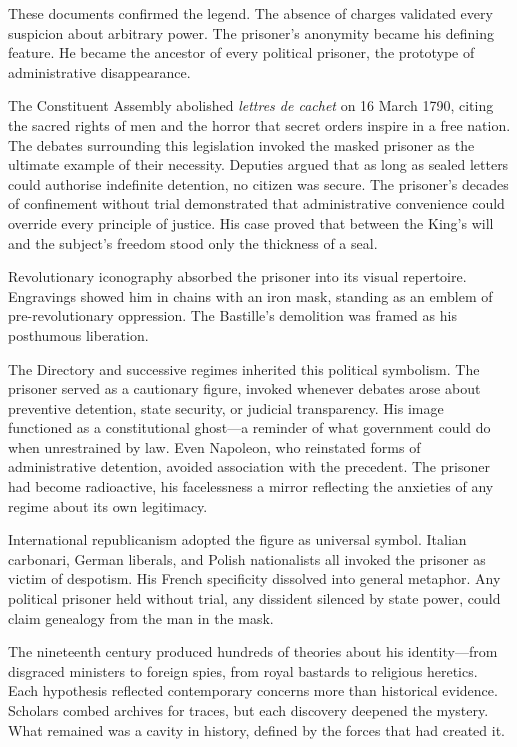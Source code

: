 These documents confirmed the legend. The absence of charges validated every suspicion about arbitrary power. The prisoner's anonymity became his defining feature. He became the ancestor of every political prisoner, the prototype of administrative disappearance.

The Constituent Assembly abolished \textit{lettres de cachet} on 16 March 1790, citing \QENOpen{}the sacred rights of men\QENClose{} and \QENOpen{}the horror that secret orders inspire in a free nation.\QENClose{} The debates surrounding this legislation invoked the masked prisoner as the ultimate example of their necessity. Deputies argued that as long as sealed letters could authorise indefinite detention, no citizen was secure. The prisoner's decades of confinement without trial demonstrated that administrative convenience could override every principle of justice. His case proved that between the King's will and the subject's freedom stood only the thickness of a seal.

Revolutionary iconography absorbed the prisoner into its visual repertoire. Engravings showed him in chains with an iron mask, standing as an emblem of pre-revolutionary oppression. The Bastille’s demolition was framed as his posthumous liberation.

The Directory and successive regimes inherited this political symbolism. The prisoner served as a cautionary figure, invoked whenever debates arose about preventive detention, state security, or judicial transparency. His image functioned as a constitutional ghost—a reminder of what government could do when unrestrained by law. Even Napoleon, who reinstated forms of administrative detention, avoided association with the precedent. The prisoner had become radioactive, his facelessness a mirror reflecting the anxieties of any regime about its own legitimacy.

International republicanism adopted the figure as universal symbol. Italian carbonari, German liberals, and Polish nationalists all invoked the prisoner as victim of despotism. His French specificity dissolved into general metaphor. Any political prisoner held without trial, any dissident silenced by state power, could claim genealogy from the man in the mask.

The nineteenth century produced hundreds of theories about his identity—from disgraced ministers to foreign spies, from royal bastards to religious heretics. Each hypothesis reflected contemporary concerns more than historical evidence. Scholars combed archives for traces, but each discovery deepened the mystery. What remained was a cavity in history, defined by the forces that had created it.

